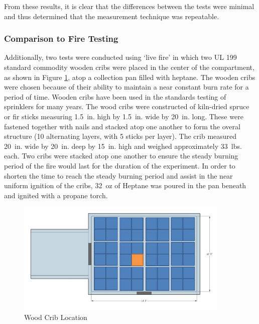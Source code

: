 \documentclass{article}
\begin{document}
\vspace*{\baselineskip}

From these results, it is clear that the differences between the tests were minimal and thus determined that the measurement technique was repeatable.

\clearpage

\subsubsection{Comparison to Fire Testing}

Additionally, two tests were conducted using `live fire' in which two UL 199 standard commodity wooden cribs were placed in the center of the compartment, as shown in Figure \ref{fig:Wood_Crib_Location}, atop a collection pan filled with heptane. The wooden cribs were chosen because of their ability to maintain a near constant burn rate for a period of time. Wooden cribs have been used in the standards testing of sprinklers for many years. The wood cribs were constructed of kiln-dried spruce or fir sticks measuring 1.5~in. high by 1.5~in. wide by 20~in. long. These were fastened together with nails and stacked atop one another to form the overal structure (10 alternating layers, with 5 sticks per layer). The crib measured 20~in. wide by 20~in. deep by 15~in. high and weighed approximately 33~lbs. each. Two cribs were stacked atop one another to ensure the steady burning period of the fire would last for the duration of the experiment. In order to shorten the time to reach the steady burning period and assist in the near uniform ignition of the cribs, 32~oz of Heptane was poured in the pan beneath and ignited with a propane torch.

\begin{figure}[!ht]
	\centering
	\includegraphics[width=4in]{Figures/Water_Distribution/ADDcriblocation.jpg}
	\caption{Wood Crib Location}
	\label{fig:Wood_Crib_Location}
\end{figure}
\end{document}
